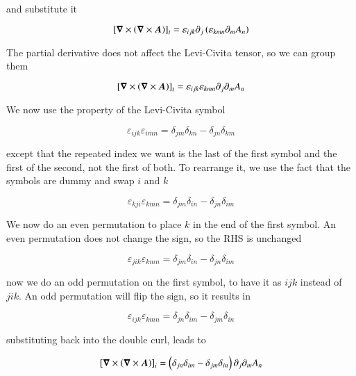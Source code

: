 \noindent and substitute it 


\begin{equation}
\left[{\boldsymbol{\nabla}}\times{\left({\boldsymbol{\nabla}}\times{{\boldsymbol{A}}}\right)}\right]_i=\varepsilon_{ijk}\partial_j \left(\varepsilon_{kmn}\partial_m A_n\right)
\end{equation}

\noindent The partial derivative does not affect the Levi-Civita tensor, so we can group them 

\begin{equation}
\left[{\boldsymbol{\nabla}}\times{\left({\boldsymbol{\nabla}}\times{{\boldsymbol{A}}}\right)}\right]_i=\varepsilon_{ijk}\varepsilon_{kmn}\partial_j \partial_m A_n
\end{equation}


\noindent We now use the property of the Levi-Civita symbol 

\begin{equation}
\varepsilon_{ijk}\varepsilon_{imn}  = \delta_{jm}\delta_{kn}-\delta_{jn}\delta_{km}
\end{equation}

\noindent except that the repeated index we want is the last of the first symbol and the first of the second, not the first of both. To rearrange it, we use the fact that the symbols are dummy and swap $i$ and $k$

\begin{equation}
\varepsilon_{kji}\varepsilon_{kmn}  = \delta_{jm}\delta_{in}-\delta_{jn}\delta_{im}
\end{equation}

\noindent We now do an even permutation to place $k$ in the end of the first symbol. An even permutation does not change the sign, so the RHS is unchanged

\begin{equation}
\varepsilon_{jik}\varepsilon_{kmn}  = \delta_{jm}\delta_{in}-\delta_{jn}\delta_{im}
\end{equation}

\noindent now we do an odd permutation on the first symbol, to have it as $ijk$ instead of $jik$. An odd permutation will flip the sign, so it results in 

\begin{equation}
\varepsilon_{ijk}\varepsilon_{kmn}  = \delta_{jn}\delta_{im}-\delta_{jm}\delta_{in}
\end{equation}


\noindent substituting back into the double curl, leads to 

\begin{equation}
\left[{\boldsymbol{\nabla}}\times{\left({\boldsymbol{\nabla}}\times{{\boldsymbol{A}}}\right)}\right]_i=\left(\delta_{jn}\delta_{im}-\delta_{jm}\delta_{in}\right)\partial_j \partial_m A_n
\end{equation}



